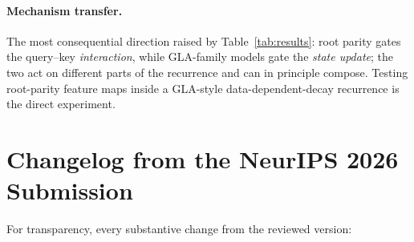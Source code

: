 \documentclass{article}
\begin{document}
\paragraph{Mechanism transfer.} The most consequential direction raised by Table~\ref{tab:results}: root parity gates the query--key \emph{interaction}, while GLA-family models gate the \emph{state update}; the two act on different parts of the recurrence and can in principle compose. Testing root-parity feature maps inside a GLA-style data-dependent-decay recurrence is the direct experiment.

\section{Changelog from the NeurIPS 2026 Submission}
\label{app:changelog}

For transparency, every substantive change from the reviewed version:
\end{document}
